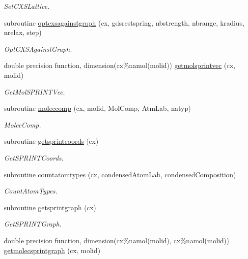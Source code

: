 \begin{DoxyCompactItemize}
\begin{DoxyCompactList}\small\item\em Set\+C\+X\+S\+Lattice. \end{DoxyCompactList}\item 
subroutine \mbox{\hyperlink{namespacechemstr_a579dfeacef98930d51ce127c936910ce}{optcxsagainstgraph}} (cx, gdsrestspring, nbstrength, nbrange, kradius, nrelax, step)
\begin{DoxyCompactList}\small\item\em Opt\+C\+X\+S\+Against\+Graph. \end{DoxyCompactList}\item 
double precision function, dimension(cx\%namol(molid)) \mbox{\hyperlink{namespacechemstr_afabbf69cf7b56ec0c275afa8de941dd8}{getmolsprintvec}} (cx, molid)
\begin{DoxyCompactList}\small\item\em Get\+Mol\+S\+P\+R\+I\+N\+T\+Vec. \end{DoxyCompactList}\item 
subroutine \mbox{\hyperlink{namespacechemstr_a4a2608dcb652cb00a11013cccf4e94b8}{moleccomp}} (cx, molid, Mol\+Comp, Atm\+Lab, natyp)
\begin{DoxyCompactList}\small\item\em Molec\+Comp. \end{DoxyCompactList}\item 
subroutine \mbox{\hyperlink{namespacechemstr_a0d2a715a7be719b13cca90019bdf542d}{getsprintcoords}} (cx)
\begin{DoxyCompactList}\small\item\em Get\+S\+P\+R\+I\+N\+T\+Coords. \end{DoxyCompactList}\item 
subroutine \mbox{\hyperlink{namespacechemstr_a6e02c23c18928196e92a1cdded34c7a7}{countatomtypes}} (cx, condensed\+Atom\+Lab, condensed\+Composition)
\begin{DoxyCompactList}\small\item\em Count\+Atom\+Types. \end{DoxyCompactList}\item 
subroutine \mbox{\hyperlink{namespacechemstr_aa95cf9277a2a7cc615ac876e1d8d3753}{getsprintgraph}} (cx)
\begin{DoxyCompactList}\small\item\em Get\+S\+P\+R\+I\+N\+T\+Graph. \end{DoxyCompactList}\item 
double precision function, dimension(cx\%namol(molid), cx\%namol(molid)) \mbox{\hyperlink{namespacechemstr_aef2c3947de661cdb93febb1e495a5551}{getmolecsprintgraph}} (cx, molid)

\end{DoxyCompactItemize}
